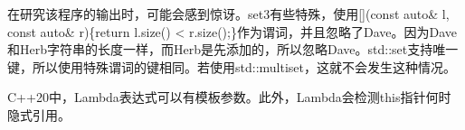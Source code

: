 在研究该程序的输出时，可能会感到惊讶。set3有些特殊，使用[](const auto\& l, const auto\& r)\{return l.size() < r.size();\}作为谓词，并且忽略了Dave。因为Dave和Herb字符串的长度一样，而Herb是先添加的，所以忽略Dave。std::set支持唯一键，所以使用特殊谓词的键相同。若使用std::multiset，这就不会发生这种情况。

\begin{tcolorbox}[breakable,enhanced jigsaw,colback=mygreen!5!white,colframe=mygreen!75!black,title={总结}]
C++20中，Lambda表达式可以有模板参数。此外，Lambda会检测this指针何时隐式引用。
\end{tcolorbox}

\newpage








